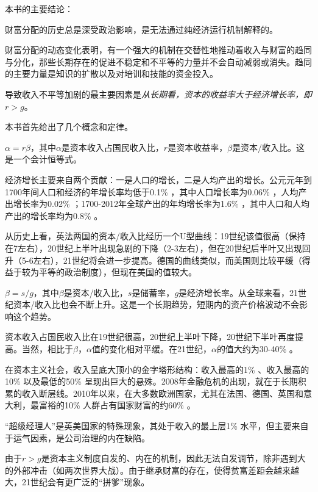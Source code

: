 本书的主要结论：
\begin{itemize*}
	\item 财富分配的历史总是深受政治影响，是无法通过纯经济运行机制解释的。
	\item 财富分配的动态变化表明，有一个强大的机制在交替性地推动着收入与财富的趋同与分化，那些长期存在的促进不稳定和不平等的力量并不会自动减弱或消失。趋同的主要力量是知识的扩散以及对培训和技能的资金投入。
	\item 导致收入不平等加剧的最主要因素是\emph{从长期看，资本的收益率大于经济增长率，即$r>g$}。
\end{itemize*}

本书首先给出了几个概念和定律。
\begin{theorem}[资本主义第一基本规律]
$\alpha = r \beta$，其中$\alpha$是资本收入占国民收入比，$r$是资本收益率，$\beta$是资本/收入比。这是一个会计恒等式。
\end{theorem}

经济增长主要来自两个贡献：一是人口的增长，二是人均产出的增长。公元元年到1700年间人口和经济的年增长率均低于0.1\% ，其中人口增长率为0.06\% ，人均产出增长率为0.02\% ；1700-2012年全球产出的年均增长率为1.6\% ，其中人口和人均产出的增长率均为0.8\% 。

从历史上看，英法两国的资本/收入比经历一个U型曲线：19世纪该值很高（保持在7左右），20世纪上半叶出现急剧的下降（2-3左右），但在20世纪后半叶又出现回升（5-6左右），21世纪将会进一步提高。德国的曲线类似，而美国则比较平缓（得益于较为平等的政治制度），但现在美国的值较大。

\begin{theorem}[资本主义第二基本规律]
$\beta = s/g$，其中$\beta$是资本/收入比，$s$是储蓄率，$g$是经济增长率。从全球来看，21世纪资本/收入比也会不断上升。这是一个长期趋势，短期内的资产价格波动不会影响这个趋势。
\end{theorem}

资本收入占国民收入比在19世纪很高，20世纪上半叶下降，20世纪下半叶再度提高。当然，相比于$\beta$，$\alpha$值的变化相对平缓。在21世纪，$\alpha$的值大约为30-40\% 。

在资本主义社会，收入呈底大顶小的金字塔形结构：收入最高的1\% 、收入最高的10\% 以及最低的50\% 呈现出巨大的悬殊。2008年金融危机的出现，就在于长期积累的收入断层线。2010年以来，在大多数欧洲国家，尤其在法国、德国、英国和意大利，最富裕的10\% 人群占有国家财富的约60\% 。

“超级经理人”是英美国家的特殊现象，其处于收入的最上层1\% 水平，但主要来自于运气因素，是公司治理的内在缺陷。

由于$r>g$是资本主义制度自发的、内在的机制，因此无法自发调节，除非遇到大的外部冲击（如两次世界大战）。由于继承财富的存在，使得贫富差距会越来越大，21世纪会有更广泛的“拼爹”现象。

